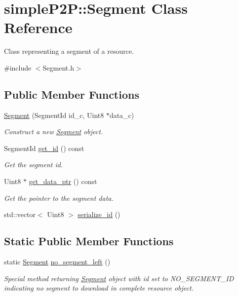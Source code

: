\hypertarget{classsimpleP2P_1_1Segment}{}\section{simple\+P2P\+:\+:Segment Class Reference}
\label{classsimpleP2P_1_1Segment}


Class representing a segment of a resource.  




{\ttfamily \#include $<$Segment.\+h$>$}

\subsection*{Public Member Functions}
\begin{DoxyCompactItemize}
\item 
\hyperlink{classsimpleP2P_1_1Segment_a35cd2a4c12538c14fca1943a2145b160}{Segment} (Segment\+Id id\+\_\+c, Uint8 $\ast$data\+\_\+c)
\begin{DoxyCompactList}\small\item\em Construct a new \hyperlink{classsimpleP2P_1_1Segment}{Segment} object. \end{DoxyCompactList}\item 
Segment\+Id \hyperlink{classsimpleP2P_1_1Segment_a668617f24ad0ffd7cdf974cbfff29689}{get\+\_\+id} () const
\begin{DoxyCompactList}\small\item\em Get the segment id. \end{DoxyCompactList}\item 
Uint8 $\ast$ \hyperlink{classsimpleP2P_1_1Segment_ac46dfa3d5857e6ba03919738cc741dab}{get\+\_\+data\+\_\+ptr} () const
\begin{DoxyCompactList}\small\item\em Get the pointer to the segment data. \end{DoxyCompactList}\item 
std\+::vector$<$ Uint8 $>$ \hyperlink{classsimpleP2P_1_1Segment_a2a153d1483576cdec85e0bbfe10e11b5}{serialize\+\_\+id} ()
\end{DoxyCompactItemize}
\subsection*{Static Public Member Functions}
\begin{DoxyCompactItemize}
\item 
static \hyperlink{classsimpleP2P_1_1Segment}{Segment} \hyperlink{classsimpleP2P_1_1Segment_a56647eb9ebec99422adec7934833eb18}{no\+\_\+segment\+\_\+left} ()
\begin{DoxyCompactList}\small\item\em Special method returning \hyperlink{classsimpleP2P_1_1Segment}{Segment} object with id set to N\+O\+\_\+\+S\+E\+G\+M\+E\+N\+T\+\_\+\+ID indicating no segment to download in complete resource object. \end{DoxyCompactList}\end{DoxyCompactItemize}
